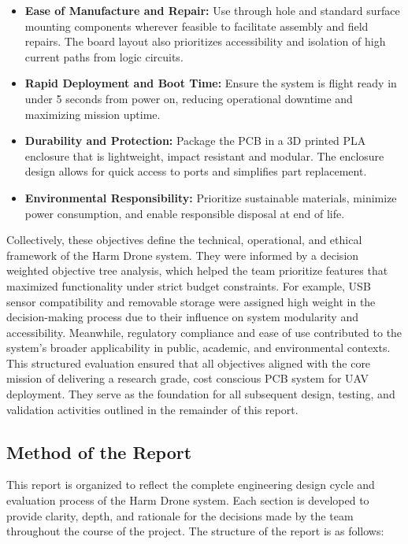 \documentclass[12pt]{article}
\begin{document}
\begin{itemize}
\item \textbf{Ease of Manufacture and Repair:} Use through hole and standard surface mounting components wherever feasible to facilitate assembly and field repairs. The board layout also prioritizes accessibility and isolation of high current paths from logic circuits.

\item \textbf{Rapid Deployment and Boot Time:} Ensure the system is flight ready in under 5 seconds from power on, reducing operational downtime and maximizing mission uptime.

\item \textbf{Durability and Protection:} Package the PCB in a 3D printed PLA enclosure that is lightweight, impact resistant and modular. The enclosure design allows for quick access to ports and simplifies part replacement.

\item \textbf{Environmental Responsibility:} Prioritize sustainable materials, minimize power consumption, and enable responsible disposal at end of life.

\end{itemize}

\par Collectively, these objectives define the technical, operational, and ethical framework of the Harm Drone system. They were informed by a decision weighted objective tree analysis, which helped the team prioritize features that maximized functionality under strict budget constraints. For example, USB sensor compatibility and removable storage were assigned high weight in the decision-making process due to their influence on system modularity and accessibility. Meanwhile, regulatory compliance and ease of use contributed to the system's broader applicability in public, academic, and environmental contexts. This structured evaluation ensured that all objectives aligned with the core mission of delivering a research grade, cost conscious PCB system for UAV deployment. They serve as the foundation for all subsequent design, testing, and validation activities outlined in the remainder of this report.

\subsection{Method of the Report}

\par This report is organized to reflect the complete engineering design cycle and evaluation process of the Harm Drone system. Each section is developed to provide clarity, depth, and rationale for the decisions made by the team throughout the course of the project. The structure of the report is as follows:
\end{document}
